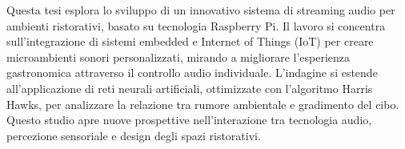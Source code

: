 
%


Questa tesi esplora lo sviluppo di un innovativo sistema di streaming audio per ambienti ristorativi, basato su tecnologia Raspberry Pi. Il lavoro si concentra sull'integrazione di sistemi embedded e Internet of Things (IoT) per creare microambienti sonori personalizzati, mirando a migliorare l'esperienza gastronomica attraverso il controllo audio individuale. L'indagine si estende all'applicazione di reti neurali artificiali, ottimizzate con l'algoritmo Harris Hawks, per analizzare la relazione tra rumore ambientale e gradimento del cibo. Questo studio apre nuove prospettive nell'interazione tra tecnologia audio, percezione sensoriale e design degli spazi ristorativi.


